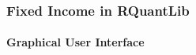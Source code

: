 \documentclass[smaller,compress, 9pt]{beamer}
\begin{document}
\begin{frame}
	\frametitle{Fixed Income in RQuantLib}
	\framesubtitle{Graphical User Interface}		
\begin{center}
\end{center}
\end{frame}
\end{document}
